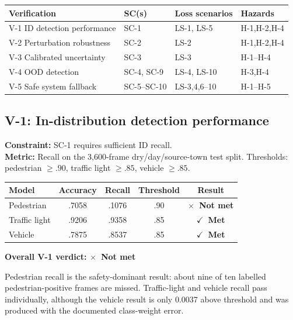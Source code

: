 \documentclass[nologo,a4paper,12pt]{article}
\makeatletter
\newcommand{\verdictmet}{\textbf{\color{mls@green}$\checkmark$~Met}}
\newcommand{\verdictnotmet}{\textbf{\color{mls@red}$\times$~Not met}}
\makeatother
\begin{document}
{\small
\begin{tabularx}{\linewidth}{@{}Yp{2.0cm}p{2.35cm}p{1.7cm}@{}}
\toprule
\textbf{Verification} & \textbf{SC(s)} & \textbf{Loss scenarios} & \textbf{Hazards} \\
\midrule
V-1 ID detection performance & SC-1 & LS-1, LS-5 & H-1,H-2,H-4 \\
V-2 Perturbation robustness & SC-2 & LS-2 & H-1,H-2,H-4 \\
V-3 Calibrated uncertainty & SC-3 & LS-3 & H-1--H-4 \\
V-4 OOD detection & SC-4, SC-9 & LS-4, LS-10 & H-3,H-4 \\
V-5 Safe system fallback & SC-5--SC-10 & LS-3,4,6--10 & H-1--H-5 \\
\bottomrule
\end{tabularx}}

\subsection{V-1: In-distribution detection performance}

\begin{mdframed}[style=subclaim]
\textbf{Constraint:} SC-1 requires sufficient ID recall.\\
\textbf{Metric:} Recall on the 3,600-frame dry/day/source-town test split. Thresholds:
pedestrian $\geq.90$, traffic light $\geq.85$, vehicle $\geq.85$.
\end{mdframed}

\begin{mdframed}[style=evidencestyle]
\centering
\begin{tabular}{lcccc}
\toprule
Model & Accuracy & Recall & Threshold & Result \\
\midrule
Pedestrian & .7058 & .1076 & .90 & \verdictnotmet \\
Traffic light & .9206 & .9358 & .85 & \verdictmet \\
Vehicle & .7875 & .8537 & .85 & \verdictmet \\
\bottomrule
\end{tabular}

\medskip
\textbf{Overall V-1 verdict: \verdictnotmet}
\end{mdframed}

Pedestrian recall is the safety-dominant result: about nine of ten labelled pedestrian-positive
frames are missed. Traffic-light and vehicle recall pass individually, although the vehicle result
is only 0.0037 above threshold and was produced with the documented class-weight error.
\end{document}
